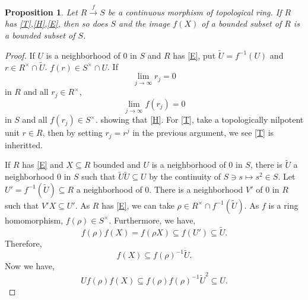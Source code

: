 \documentclass[8pt]{article}
\numberwithin{equation}{section}
\newtheorem{proposition}{Proposition}[subsection]
\begin{document}
\begin{proposition}
    \label{fact_11_4}
    Let $R\stackrel{f}{\to}S$ be a continuous morphism of topological ring. If $R$ has \eqref{T},\eqref{H},\eqref{E}, then so does $S$ and the image $f(X)$ of a bounded subset of $R$ is a bounded subset of $S$.
\end{proposition}
\begin{proof}
    If $U$ is a neighborhood of $0$ in $S$ and $R$ has \eqref{E}, put $\tilde{U}=f^{-1}(U)$ and $r\in R^\times\cap \tilde{U}$. $f(r)\in S^\times \cap U$. If 
    \begin{equation*}
        \lim_{j\to\infty} r_j = 0
    \end{equation*}
    in $R$ and all $r_j\in R^\times$,%
    \begin{equation*}
        \lim_{j\to\infty}f(r_j) = 0
    \end{equation*}
    in $S$ and all $f(r_j)\in S^\times$. 
    showing that \eqref{H}. For \eqref{T}, take a topologically nilpotent unit $r\in R$, then by setting $r_j = r^j$ in the previous argument, we see \eqref{T} is inheritted.
    \par If $R$ has \eqref{E} and $X\subseteq R$ bounded and $U$ is a neighborhood of $0$ in $S$, there is $\tilde{U}$ a neighborhood $0$ in $S$ such that $\tilde{U}\tilde{U}\subseteq U$ by the continuity of $S\ni s\mapsto s^2\in S$. Let $U' = f^{-1}(\tilde{U})\subseteq R$ a neighborhood of $0$. There is a neighborhood $V'$ of $0$ in $R$ such that $V'X\subseteq U'$. As $R$ has \eqref{E}, we can take $\rho\in R^\times\cap f^{-1}(\tilde{U})$. As $f$ is a ring homomorphism, $f(\rho)\in S^\times$.
    Furthermore, we have,
    \begin{equation*}
        f(\rho)f(X) = f(\rho X) \subseteq f(U')\subseteq \tilde{U}. 
    \end{equation*}
    Therefore,
    \begin{equation*}
        f(X)\subseteq f(\rho)^{-1}\tilde{U}.
    \end{equation*}
    Now we have,
    \begin{equation*}
       U f(\rho)f(X) \subseteq f(\rho)f(\rho)^{-1}\tilde{U}^2\subseteq U.
    \end{equation*}
\end{proof}
\end{document}
